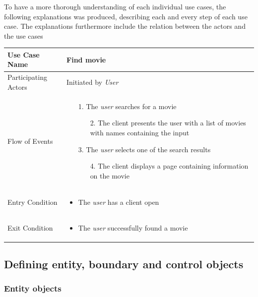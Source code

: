To have a more thorough understanding of each individual use cases, the following explanations was produced, describing each and every step of each use case.
The explanations furthermore include the relation between the actors and the use cases

\begin{center}
	\begin{tabular}{ | l | p{10cm} |  }
		 \hline
		Use Case Name & Find movie \\ \hline
		Participating Actors & Initiated by \emph{User} \\ \hline
		Flow of Events & \begin{enumerate}
						\item[1.] The \emph{user} searches for a movie
						\begin{enumerate}
							\item[2.] The client presents the user with a list of movies with names containing the input
						\end{enumerate}
						\item[3.] The \emph{user} selects one of the search results
						\begin{enumerate}
							\item[4.] The client displays a page containing information on the movie
						\end{enumerate}
					\end{enumerate} \\ \hline
		Entry Condition & \begin{itemize}
						\item The \emph{user} has a client open
					\end{itemize} \\ \hline
		Exit Condition & \begin{itemize}
						\item The \emph{user} successfully found a movie
					\end{itemize} \\
		\hline
	\end{tabular}
\end{center}

\subsection{Defining entity, boundary and control objects}

\subsubsection{Entity objects}

